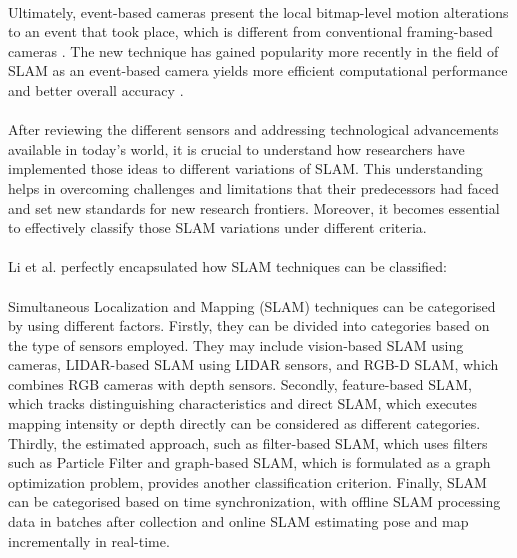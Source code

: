 \paragraph*{}
Ultimately, event-based cameras present the local bitmap-level motion alterations to an event that took place, which is different from conventional framing-based cameras \cite{udugama2023evolution}. The new technique has gained popularity more recently in the field of SLAM as an event-based camera yields more efficient computational performance and better overall accuracy \cite{huang2023event}.

\paragraph*{}
After reviewing the different sensors and addressing technological advancements available in today’s world, it is crucial to understand how researchers have implemented those ideas to different variations of SLAM. This understanding helps in overcoming challenges and limitations that their predecessors had faced and set new standards for new research frontiers. Moreover, it becomes essential to effectively classify those SLAM variations under different criteria.

\paragraph*{}
Li et al.\cite{li2024object} perfectly encapsulated how SLAM techniques can be classified: 

\paragraph*{}
Simultaneous Localization and Mapping (SLAM) techniques can be categorised by using different factors. Firstly, they can be divided into categories based on the type of sensors employed. They may include vision-based SLAM using cameras, LIDAR-based SLAM using LIDAR sensors, and RGB-D SLAM, which combines RGB cameras with depth sensors. Secondly, feature-based SLAM, which tracks distinguishing characteristics and direct SLAM, which executes mapping intensity or depth directly can be considered as different categories. Thirdly, the estimated approach, such as filter-based SLAM, which uses filters such as Particle Filter and graph-based SLAM, which is formulated as a graph optimization problem, provides another classification criterion. Finally, SLAM can be categorised based on time synchronization, with offline SLAM processing data in batches after collection and online SLAM estimating pose and map incrementally in real-time.

